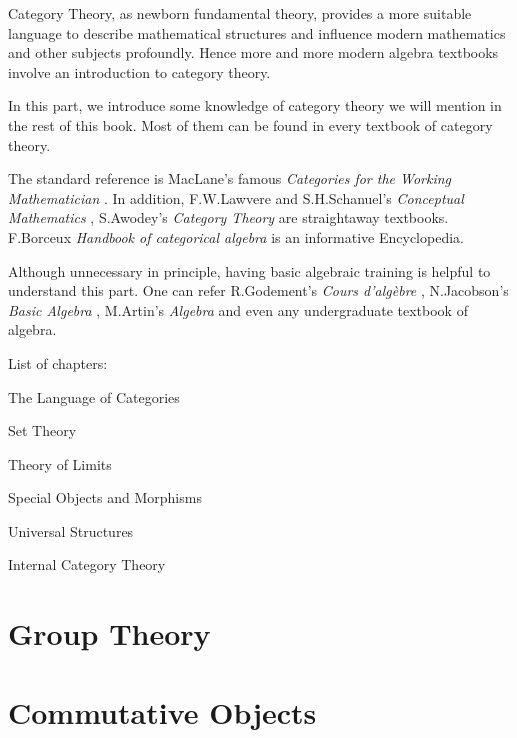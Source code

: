   Category Theory, as newborn fundamental theory, provides a more suitable language to describe mathematical structures and influence modern mathematics and other subjects profoundly. Hence more and more modern algebra textbooks involve an introduction to category theory.

  In this part, we introduce some knowledge of category theory we will mention in the rest of this book. Most of them can be found in every textbook of category theory.

  The standard reference is MacLane's famous \emph{Categories for the Working Mathematician} \cite{lane1998categories}.
  In addition, F.W.Lawvere and S.H.Schanuel's \emph{Conceptual Mathematics} \cite{lawvere1997conceptual}, S.Awodey's \emph{Category Theory} \cite{awodey2010category} are straightaway textbooks.
  F.Borceux \emph{Handbook of categorical algebra} \cite{borceux} is an informative Encyclopedia.

  Although unnecessary in principle, having basic algebraic training is helpful to understand this part. One can refer
  R.Godement's \emph{Cours d'alg{\`e}bre} \cite{godement1963cours}, N.Jacobson's \emph{Basic Algebra} \cite{jacobson1980basic}, M.Artin's \emph{Algebra} \cite{artin2011algebra} and even any undergraduate textbook of algebra.

  List of chapters:

  The Language of Categories

  Set Theory

  Theory of Limits

  Special Objects and Morphisms

  Universal Structures

  Internal Category Theory

  
  
  
  



  



\part{Group Theory}


\part{Commutative Objects}
